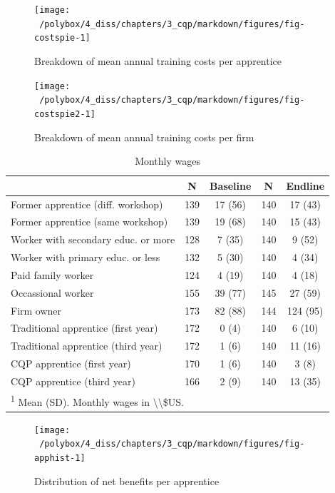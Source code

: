 \documentclass[
  11pt,
a4paper
]{report}
\begin{document}
\renewcommand{\arraystretch}{1}

\begin{figure}[H]
\texttt{[image: ~/polybox/4\_diss/chapters/3\_cqp/markdown/figures/fig-costspie-1]} \caption{Breakdown of mean annual training costs per apprentice}\label{fig:fig-costspie}
\end{figure}

\begin{figure}[H]
\texttt{[image: ~/polybox/4\_diss/chapters/3\_cqp/markdown/figures/fig-costspie2-1]} \caption{Breakdown of mean annual training costs per firm}\label{fig:fig-costspie2}
\end{figure}

\begin{table}

\caption{\label{tab:tbl-wages}Monthly wages}
\centering
\begin{tabular}[t]{lcccc}
\toprule
 & \textbf{N} & \textbf{Baseline} & \textbf{N} & \textbf{Endline}\\
\midrule
Former apprentice (diff. workshop) & 139 & 17 (56) & 140 & 17 (43)\\
Former apprentice (same workshop) & 139 & 19 (68) & 140 & 15 (43)\\
Worker with secondary educ. or more & 128 & 7 (35) & 140 & 9 (52)\\
Worker with primary educ. or less & 132 & 5 (30) & 140 & 4 (34)\\
Paid family worker & 124 & 4 (19) & 140 & 4 (18)\\
Occassional worker & 155 & 39 (77) & 145 & 27 (59)\\
Firm owner & 173 & 82 (88) & 144 & 124 (95)\\
Traditional apprentice (first year) & 172 & 0 (4) & 140 & 6 (10)\\
Traditional apprentice (third year) & 172 & 1 (6) & 140 & 11 (16)\\
CQP apprentice (first year) & 170 & 1 (6) & 140 & 3 (8)\\
CQP apprentice (third year) & 166 & 2 (9) & 140 & 13 (35)\\
\bottomrule
\multicolumn{5}{l}{\rule{0pt}{1em}\textsuperscript{1} Mean (SD). Monthly wages in \textbackslash{}\textbackslash{}\$US.}\\
\end{tabular}
\end{table}

\begin{figure}
\texttt{[image: ~/polybox/4\_diss/chapters/3\_cqp/markdown/figures/fig-apphist-1]} \caption{Distribution of net benefits per apprentice}\label{fig:fig-apphist}
\end{figure}
\end{document}
